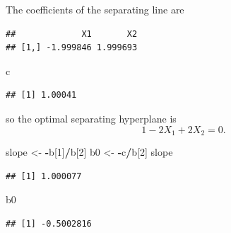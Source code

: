 \documentclass[
]{book}
\newenvironment{Shaded}{\begin{snugshade}}{\end{snugshade}}
\newcommand{\DecValTok}[1]{\textcolor[rgb]{0.00,0.00,0.81}{#1}}
\newcommand{\FunctionTok}[1]{\textcolor[rgb]{0.13,0.29,0.53}{\textbf{#1}}}
\newcommand{\NormalTok}[1]{#1}
\newcommand{\OtherTok}[1]{\textcolor[rgb]{0.56,0.35,0.01}{#1}}
\newcommand{\SpecialCharTok}[1]{\textcolor[rgb]{0.81,0.36,0.00}{\textbf{#1}}}
\begin{document}
The coefficients of the separating line are

\begin{Shaded}
\end{Shaded}

\begin{verbatim}
##             X1       X2
## [1,] -1.999846 1.999693
\end{verbatim}

\begin{Shaded}
\begin{Highlighting}[]
\NormalTok{c}
\end{Highlighting}
\end{Shaded}

\begin{verbatim}
## [1] 1.00041
\end{verbatim}

so the optimal separating hyperplane is
\[
1 - 2X_1 + 2X_2 = 0.
\]

\begin{Shaded}
\begin{Highlighting}[]
\NormalTok{slope }\OtherTok{\textless{}{-}} \SpecialCharTok{{-}}\NormalTok{b[}\DecValTok{1}\NormalTok{]}\SpecialCharTok{/}\NormalTok{b[}\DecValTok{2}\NormalTok{]}
\NormalTok{b0 }\OtherTok{\textless{}{-}} \SpecialCharTok{{-}}\NormalTok{c}\SpecialCharTok{/}\NormalTok{b[}\DecValTok{2}\NormalTok{]}
\NormalTok{slope}
\end{Highlighting}
\end{Shaded}

\begin{verbatim}
## [1] 1.000077
\end{verbatim}

\begin{Shaded}
\begin{Highlighting}[]
\NormalTok{b0}
\end{Highlighting}
\end{Shaded}

\begin{verbatim}
## [1] -0.5002816
\end{verbatim}
\end{document}
